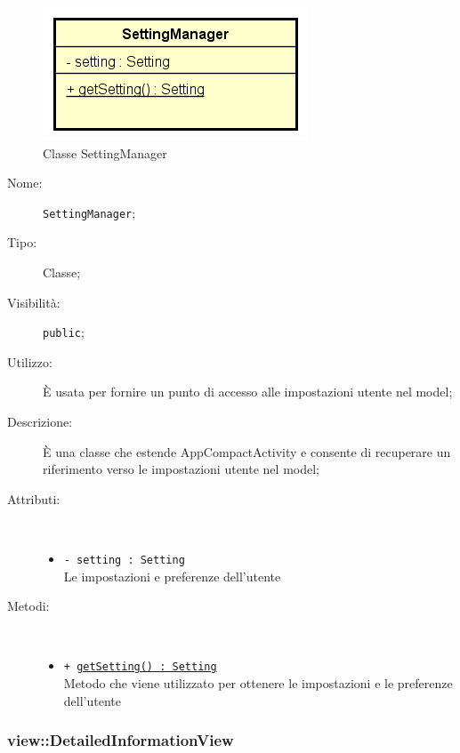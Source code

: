\documentclass[../DefinizioneDiProdotto.tex]{subfiles}
\begin{document}
    \begin{figure}[H]
        \centering
        \includegraphics{img/SettingManager.png}
        \caption{Classe SettingManager}\label{fig:presenter::SettingManager} 
    \end{figure}
    \begin{description}
\item[Nome:] \texttt{SettingManager};
\item[Tipo:] Classe;
\item[Visibilità:] \texttt{public};
\item[Utilizzo:] È usata per fornire un punto di accesso alle impostazioni utente nel model;
\item[Descrizione:] È una classe che estende AppCompactActivity e consente di recuperare un riferimento verso le impostazioni utente nel model;
\item[Attributi:] \
\begin{itemize}
\item \texttt{- setting : Setting}\\
Le impostazioni e preferenze dell'utente

\end{itemize}
\item[Metodi:] \
\begin{itemize}
\item \texttt{+ \underline{getSetting() : Setting}}\\
Metodo che viene utilizzato per ottenere le impostazioni e le preferenze dell'utente
 \end{itemize}
\end{description}

\subsubsection{view::DetailedInformationView}
\end{document}
